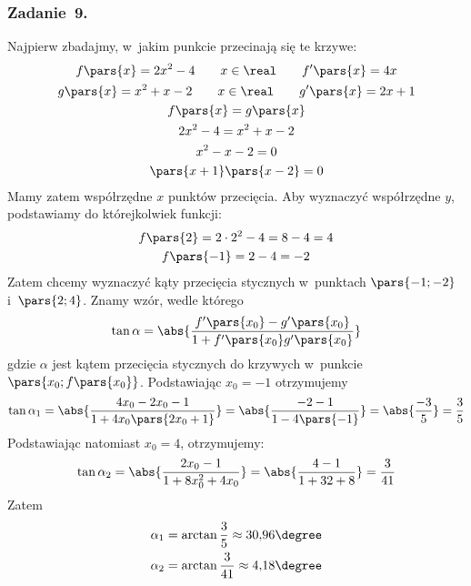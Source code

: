 \subsubsection*{Zadanie~9.}
Najpierw zbadajmy, w~jakim punkcie przecinają się te krzywe:
\begin{gather*}
    f\pars{x} = 2x^2 - 4 \qquad x \in \real \qquad f'\pars{x} = 4x\\
    g\pars{x} = x^2 + x - 2 \qquad x \in \real \qquad g'\pars{x} = 2x + 1\\
    f\pars{x} = g\pars{x}\\
    2x^2 - 4 = x^2 + x - 2\\
    x^2 - x - 2 = 0\\
    \pars{x + 1}\pars{x - 2} = 0
\end{gather*}
Mamy zatem współrzędne \(x\) punktów przecięcia. Aby wyznaczyć współrzędne \(y\), podstawiamy do którejkolwiek funkcji:
\begin{gather*}
    f\pars{2} = 2 \cdot 2^2 - 4 = 8 - 4 = 4\\
    f\pars{-1} = 2 - 4 = -2
\end{gather*}
Zatem chcemy wyznaczyć kąty przecięcia stycznych w~punktach \(\pars{-1; -2}\) i~\(\pars{2; 4}\). Znamy wzór, wedle którego
\begin{equation*}
    \tan\alpha = \abs{\frac{f'\pars{x_0} - g'\pars{x_0}}{1 + f'\pars{x_0}g'\pars{x_0}}}
\end{equation*}
gdzie \(\alpha\) jest kątem przecięcia stycznych do krzywych w~punkcie \(\pars{x_0; f\pars{x_0}}\). Podstawiając \(x_0 = -1\) otrzymujemy
\begin{equation*}
    \tan\alpha_1
        = \abs{\frac{4x_0 - 2x_0 - 1}{1 + 4x_0\pars{2x_0 + 1}}}
        = \abs{\frac{-2 - 1}{1 - 4\pars{-1}}}
        = \abs{\frac{-3}{5}}
        = \frac{3}{5}
\end{equation*}
Podstawiając natomiast \(x_0 = 4\), otrzymujemy:
\begin{equation*}
    \tan\alpha_2
        = \abs{\frac{2x_0 - 1}{1 + 8x_0^2 + 4x_0}}
        = \abs{\frac{4 - 1}{1 + 32 + 8}}
        = \frac{3}{41}
\end{equation*}
Zatem
\begin{gather*}
    \alpha_1 = \arctan\frac{3}{5} \approx 30{,}96\degree\\
    \alpha_2 = \arctan\frac{3}{41} \approx 4{,}18\degree
\end{gather*}
